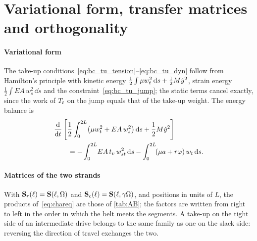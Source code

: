 \section{Variational form, transfer matrices and orthogonality}\label{app:transfer}

\paragraph{Variational form} The take-up conditions~\eqref{eq:bc_tu_tension}--\eqref{eq:bc_tu_dyn}
follow from Hamilton's principle with kinetic energy
$\tfrac12\int\mu w_t^2\,\mathrm{d} s+\tfrac12M\dot y^2$, strain energy
$\tfrac12\int EA\,w_s^2\,\dd s$ and the constraint~\eqref{eq:bc_tu_jump}; the static
terms cancel exactly, since the work of $T_t$ on the jump equals that of the take-up weight.
The energy balance is
\begin{equation}\label{eq:energy}
\begin{split}
  &\frac{\mathrm{d}}{\mathrm{d} t}\left[\frac12\int_0^{2L}\!\left(\mu w_t^2+EA\,w_s^2\right)\mathrm{d} s
  +\frac12M\dot y^2\right]\\
  &\qquad=-\int_0^{2L}\!EA\,t_v\,w_{st}^2\,\mathrm{d} s-\int_0^{2L}\!(\mu a+r\varphi)\,w_t\,\mathrm{d} s .
\end{split}
\end{equation}

\paragraph{Matrices of the two strands} With $\mathbf{S}_r(\ell)=\mathbf{S}(\ell,\Omega)$ and
$\mathbf{S}_c(\ell)=\mathbf{S}(\ell,\gamma\Omega)$, and positions in units of $L$, the products
of~\eqref{eq:chareq} are those of \cref{tab:AB}; the factors are written from right
to left in the order in which the belt meets the segments. A take-up on the tight side
of an intermediate drive belongs to the same family as one on the slack side: reversing
the direction of travel exchanges the two.

